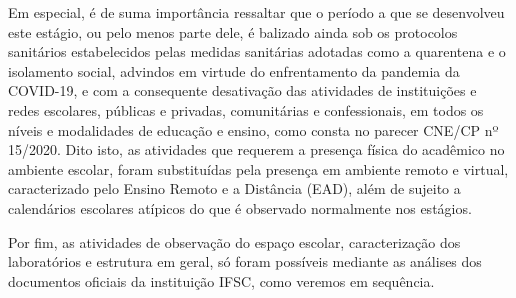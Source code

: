 Em especial, é de suma importância ressaltar que o período a que se desenvolveu este estágio, ou pelo menos parte dele, é balizado ainda sob os protocolos sanitários estabelecidos pelas medidas sanitárias adotadas como a quarentena e o isolamento social, advindos em virtude do enfrentamento da pandemia da COVID-19, e com a consequente desativação das atividades de instituições e redes escolares, públicas e privadas, comunitárias e confessionais, em todos os níveis e modalidades de educação e ensino, como consta no parecer CNE/CP nº 15/2020. Dito isto, as atividades que requerem a presença física do acadêmico no ambiente escolar, foram substituídas pela presença em ambiente remoto e virtual, caracterizado pelo Ensino Remoto e a Distância (EAD), além de sujeito a calendários escolares atípicos do que é observado normalmente nos estágios.

Por fim, as atividades de observação do espaço escolar, caracterização dos laboratórios e estrutura em geral, só foram possíveis mediante as análises dos documentos oficiais da instituição IFSC, como veremos em sequência.




	
